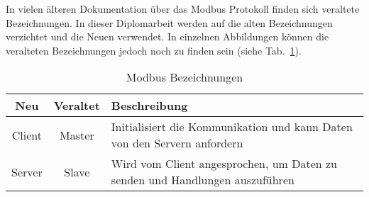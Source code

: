 

In vielen älteren Dokumentation über das Modbus Protokoll finden sich veraltete Bezeichnungen. In dieser Diplomarbeit werden auf die alten Bezeichnungen verzichtet und die Neuen verwendet. In einzelnen Abbildungen können die veralteten Bezeichnungen jedoch noch zu finden sein (siehe Tab.~\ref{tab:modbus_bezeichnung}). 
\begin{table}[h]
	\caption{Modbus Bezeichnungen \label{tab:modbus_bezeichnung}}
	\begin{tabularx}{\textwidth}{@{}c|c|X@{}}
		\toprule
		\textbf{Neu} & \textbf{Veraltet} & \textbf{Beschreibung} \\
		\midrule
		Client & Master & Initialisiert die Kommunikation und kann Daten von den Servern anfordern \\
		Server & Slave & Wird vom Client angesprochen, um Daten zu senden und Handlungen auszuführen \\
		\bottomrule
	\end{tabularx}
\end{table}



